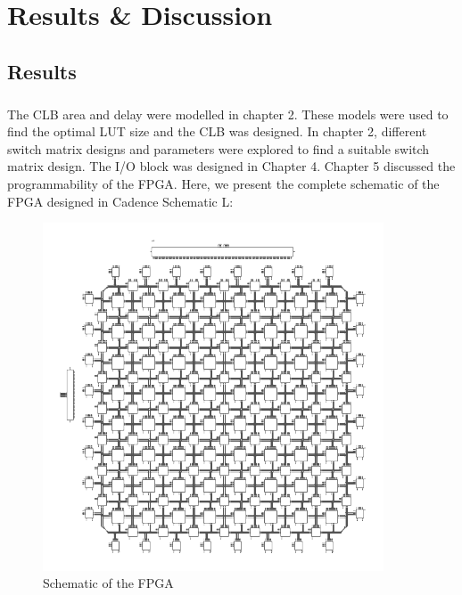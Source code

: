 %
%
\let\textcircled=\pgftextcircled
\chapter{Results \& Discussion}
\label{chap:results}

\section{Results}
\paragraph{}

The CLB area and delay were modelled in chapter 2. These models were used to find the optimal LUT size and the CLB was designed. In chapter 2, different switch matrix designs and parameters were explored to find a suitable switch matrix design. The I/O block was designed in Chapter 4. Chapter 5 discussed the programmability of the FPGA. Here, we present the complete schematic of the FPGA designed in Cadence Schematic L:

\begin{figure}[H]
\centering
\includegraphics[width=0.9\textwidth]{fpga.png}
\caption{Schematic of the FPGA}
\label{fig:Figure}
\end{figure}

